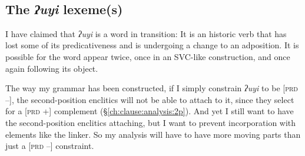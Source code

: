 \begin{singlespacing}
\ex~ \label{uunuutl-lexeme}
\xe
\end{singlespacing}

\subsection{The \textit{ʔuyi} lexeme(s)} \label{ch:link:analysis:uyi}

I have claimed that \textit{ʔuyi} is a word in transition: It is an historic verb that has lost some of its predicativeness and is undergoing a change to an adposition. It is possible for the word appear twice, once in an SVC-like construction, and once again following its object.

The way my grammar has been constructed, if I simply constrain \textit{ʔuyi} to be [\textsc{prd} --], the second-position enclitics will not be able to attach to it, since they select for a [\textsc{prd} +] complement (\S\ref{ch:clause:analysis:2p}). And yet I still want to have the second-position enclitics attaching, but I want to prevent incorporation with elements like the linker. So my analysis will have to have more  moving parts than just a [\textsc{prd} --] constraint.

